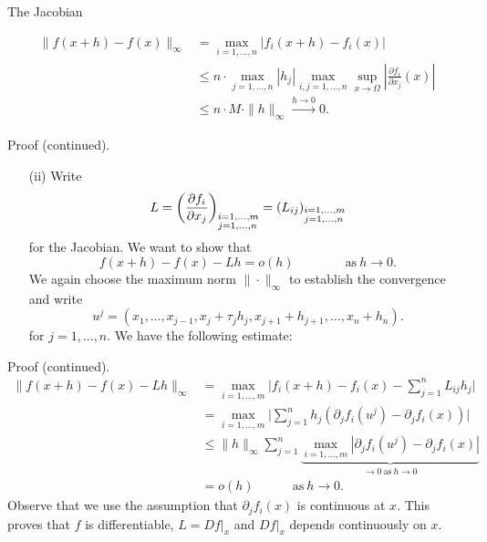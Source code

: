 \documentclass[smaller,hyperref={CJKbookmarks=true}]{beamer}
\begin{document}
\begin{frame}{The Jacobian}
\begin{spacing}{1}
\begin{itemize}
  \begin{equation*}
    \begin{split}
       \|f(x+h)-f(x)\|_{\infty} &=\max_{i=1,\ldots,n}|f_i(x+h)-f_i(x)| \\
         &\leq n\cdot\max_{j=1,\ldots,n}|h_j|\max_{i,j=1,\ldots,n}\sup\limits_{x\to\Omega}\left|\frac{\partial f_i}{\partial x_j}(x)\right|  \\
         &\leq n\cdot M\cdot\|h\|_{\infty}\xrightarrow[]{h\to0}0.
    \end{split}
  \end{equation*}
\end{itemize}
\newpage
\alert{Proof (continued).}\\[7pt]
\begin{itemize}
  \item[(ii)] Write
  \[L=\left(\frac{\partial f_i}{\partial x_j}\right)_{\begin{subarray}
          ~i=1,\ldots,m\\
          j=1,\ldots,n
        \end{subarray}}=(L_{ij})_{\begin{subarray}
          ~i=1,\ldots,m\\
          j=1,\ldots,n
        \end{subarray}}\]
  for the Jacobian. We want to show that
  \[f(x+h)-f(x)-Lh=o(h)\qquad\qquad\text{as}~h\to0.\]
  We again choose the maximum norm $\|\cdot\|_{\infty}$ to establish the convergence and write
  \[u^j=(x_1,\ldots,x_{j-1},x_j+\tau_jh_j,x_{j+1}+h_{j+1},\ldots,x_n+h_n).\]
  for $j=1,\ldots,n$. We have the following estimate:
\end{itemize}
\newpage
\alert{Proof (continued).}
\begin{equation*}
  \begin{split}
     \|f(x+h)-f(x)-Lh\|_{\infty} &=\max_{i=1,\ldots,m}\Big|f_i(x+h)-f_i(x)-\sum_{j=1}^{n}L_{ij}h_j\Big| \\
       &=\max_{i=1,\ldots,m}\Big|\sum_{j=1}^{n}h_j(\partial_jf_i(u^j)-\partial_jf_i(x))\Big| \\
       &\leq\|h\|_{\infty}\sum_{j=1}^{n}\underbrace{\max_{i=1,\ldots,m}|\partial_jf_i(u^j)-\partial_jf_i(x)|}_{\to0~\text{as}~h\to0}  \\
       &=o(h)\qquad\quad\text{as}~h\to0.
  \end{split}
\end{equation*}
Observe that we use the assumption that $\partial_jf_i(x)$ is continuous at $x$. This proves that $f$ is dif{}ferentiable, $L=Df|_x$ and $Df|_x$ depends continuously on $x$.

\end{spacing}
\end{frame}
\end{document}
